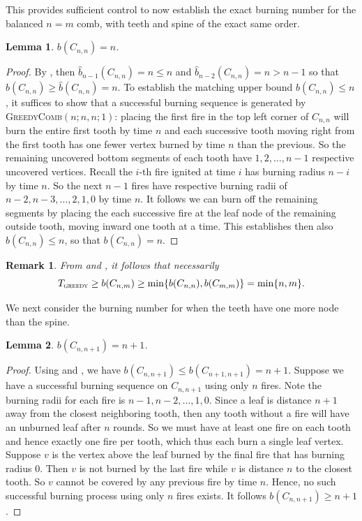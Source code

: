 \documentclass{article}
\newcommand{\gr}{\textsc{greedy}}
\newtheorem{lemma}{Lemma}
\newtheorem{remark}{Remark}
\begin{document}
This provides sufficient control to now establish the exact burning number for the balanced $n = m$ comb, with teeth and spine of the exact same order.



\begin{lemma}\label{l: n=m}
    $b(C_{n,n}) = n$.
\end{lemma}
\begin{proof}
    By , then $\hat b_{n-1}(C_{n,n}) = n \le n$ and $\hat b_{n-2}(C_{n,n}) = n > n-1$
    so that $b(C_{n,n}) \ge \hat b(C_{n,n}) = n$. To establish the matching upper bound $b(C_{n,n}) \le n$,  it suffices to show that a successful burning sequence is generated by \textsc{GreedyComb}$(n; n,n; 1)$: placing the first fire in the top left corner of $C_{n,n}$ will burn the entire first tooth by time $n$ and each successive tooth moving right from the first tooth has one fewer vertex burned by time $n$ than the previous. So the remaining uncovered bottom segments of each tooth have $1,2,\ldots,n-1$ respective uncovered vertices. Recall the $i$-th fire ignited at time $i$ has burning radius $n - i$ by time $n$. So the next $n-1$ fires have respective burning radii of $n-2, n-3,\ldots,2,1,0$ by time $n$. It follows we can burn off the remaining segments by placing the each successive fire at the leaf node of the remaining outside tooth, moving inward one tooth at a time. This establishes then also $b(C_{n,n}) \le n$, so that $b(C_{n,n}) = n$.
\end{proof}

\begin{remark}
    From  and , it follows  that necessarily 
    \begin{equation*}
        T_\gr \ge b(C_{n,m}) \ge \min\{b(C_{n,n}),b(C_{m,m})\} = \min\{n,m\}.
    \end{equation*}
\end{remark}

We next consider the burning number for when the teeth have one more node than the spine.

\begin{lemma}\label{l: n_n+1}
    $b(C_{n,n+1}) = n + 1$.
\end{lemma}
\begin{proof}
    Using  and , we have $b(C_{n,n+1}) \le b(C_{n+1,n+1}) = n + 1$. Suppose we have a successful burning sequence on $C_{n,n+1}$ using only $n$ fires. Note the burning radii for each fire is $n-1,n-2,\ldots,1,0$. Since a leaf is distance $n+1$ away from the closest neighboring tooth, then any tooth without a fire will have an unburned leaf after $n$ rounds. So we must have at least one fire on each tooth and hence exactly one fire per tooth, which thus each burn a single leaf vertex. Suppose $v$ is the vertex above the leaf burned by the final fire that has burning radius 0. Then $v$ is not burned by the last fire while $v$ is distance $n$ to the closest tooth. So $v$ cannot be covered by any previous fire by time $n$. Hence, no such successful burning process using only $n$ fires exists. It follows $b(C_{n,n+1}) \ge n + 1$. 
\end{proof}
\end{document}
